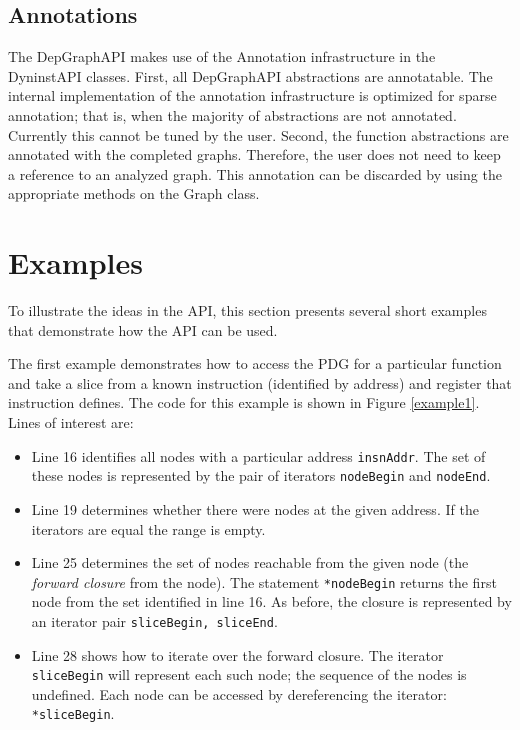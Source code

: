 \documentclass[12pt,titlepage]{article}
\begin{document}
\subsection{Annotations} 

The DepGraphAPI makes use of the Annotation infrastructure in the
DyninstAPI classes. First, all DepGraphAPI abstractions are
annotatable. The internal implementation of the annotation
infrastructure is optimized for sparse annotation; that is, when the
majority of abstractions are not annotated. Currently this cannot be
tuned by the user. Second, the function abstractions are annotated
with the completed graphs. Therefore, the user does not need to keep a
reference to an analyzed graph. This annotation can be discarded by
using the appropriate methods on the Graph class.

\section{Examples} 

To illustrate the ideas in the API, this section presents several
short examples that demonstrate how the API can be used.  

The first example demonstrates how to access the PDG for a particular
function and take a slice from a known instruction (identified by
address) and register that instruction defines. The code for this
example is shown in Figure \ref{example1}. Lines of interest are:
\begin{itemize}
\item Line 16 identifies all nodes with a particular address
  \texttt{insnAddr}. The set of these nodes is represented by the pair
  of iterators \texttt{nodeBegin} and \texttt{nodeEnd}.
\item Line 19 determines whether there were nodes at the given
  address. If the iterators are equal the range is empty.
\item Line 25 determines the set of nodes reachable from the given
  node (the \emph{forward closure} from the node). The statement
  \texttt{*nodeBegin} returns the first node from the set identified
  in line 16. As before, the closure is represented by an iterator
  pair \texttt{sliceBegin, sliceEnd}. 
\item Line 28 shows how to iterate over the forward closure. The
  iterator \texttt{sliceBegin} will represent each such node; the
  sequence of the nodes is undefined. Each node can be accessed by
  dereferencing the iterator: \texttt{*sliceBegin}.
\end{itemize}
\end{document}

